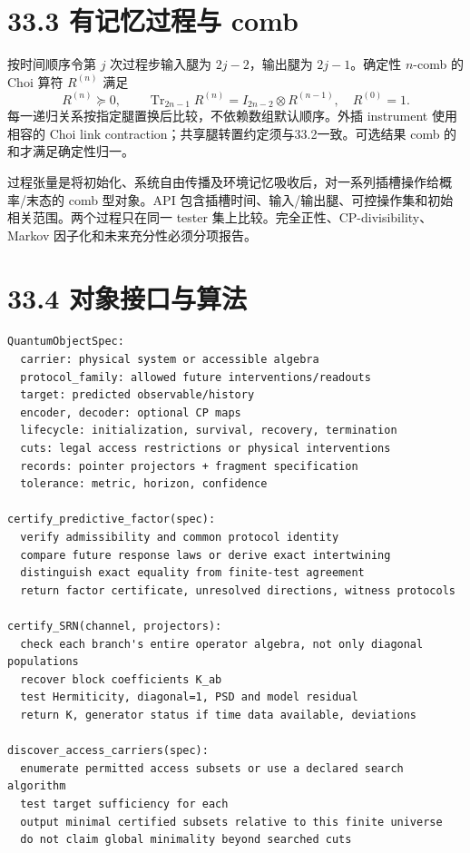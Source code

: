 \documentclass[
  11pt,
  oneside]{book}
\begin{document}
\section{33.3 有记忆过程与 comb}

按时间顺序令第 \(j\) 次过程步输入腿为 \(2j-2\)，输出腿为
\(2j-1\)。确定性 \(n\)-comb 的 Choi 算符 \(R^{(n)}\) 满足 \[
R^{(n)}\succeq0,\qquad
\operatorname{Tr}_{2n-1}R^{(n)}
=I_{2n-2}\otimes R^{(n-1)},\quad R^{(0)}=1.
\] 每一递归关系按指定腿置换后比较，不依赖数组默认顺序。外插 instrument
使用相容的 Choi link contraction；共享腿转置约定须与33.2一致。可选结果
comb 的和才满足确定性归一。

过程张量是将初始化、系统自由传播及环境记忆吸收后，对一系列插槽操作给概率/末态的
comb 型对象。API
包含插槽时间、输入/输出腿、可控操作集和初始相关范围。两个过程只在同一
tester 集上比较。完全正性、CP-divisibility、Markov
因子化和未来充分性必须分项报告。

\section{33.4 对象接口与算法}

\begin{Verbatim}[breaklines,breakanywhere,fontsize=\scriptsize]
QuantumObjectSpec:
  carrier: physical system or accessible algebra
  protocol_family: allowed future interventions/readouts
  target: predicted observable/history
  encoder, decoder: optional CP maps
  lifecycle: initialization, survival, recovery, termination
  cuts: legal access restrictions or physical interventions
  records: pointer projectors + fragment specification
  tolerance: metric, horizon, confidence

certify_predictive_factor(spec):
  verify admissibility and common protocol identity
  compare future response laws or derive exact intertwining
  distinguish exact equality from finite-test agreement
  return factor certificate, unresolved directions, witness protocols

certify_SRN(channel, projectors):
  check each branch's entire operator algebra, not only diagonal populations
  recover block coefficients K_ab
  test Hermiticity, diagonal=1, PSD and model residual
  return K, generator status if time data available, deviations

discover_access_carriers(spec):
  enumerate permitted access subsets or use a declared search algorithm
  test target sufficiency for each
  output minimal certified subsets relative to this finite universe
  do not claim global minimality beyond searched cuts
\end{Verbatim}
\end{document}
